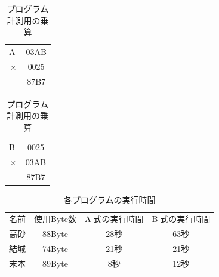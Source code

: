 \documentclass[dvipdfmx]{jsarticle}
\begin{document}
\begin{table}[H]
    \centering
    \caption{プログラム計測用の乗算}
    \label{table:fast}
    \begin{minipage}[b]{0.49\columnwidth}
        \centering
        \begin{tabular}{cc}
            \textcircled{\scriptsize A}& 03AB \\
            $\times$ & 0025 \\
            \hline
            & 87B7
        \end{tabular}
    \end{minipage}
    \begin{minipage}[b]{0.49\columnwidth}
        \centering
        \begin{tabular}{cc}
            \textcircled{\scriptsize B}& 0025 \\
            $\times$ & 03AB \\
            \hline
            & 87B7
        \end{tabular}
    \end{minipage}
\end{table}

\begin{table}[H]
    \centering
    \caption{各プログラムの実行時間}
    \label{table:time}
    \begin{tabular}{|c|c|c|c|}
        名前 & 使用Byte数 & \textcircled{\scriptsize A}式の実行時間 & \textcircled{\scriptsize B}式の実行時間 \\
        高砂 & 88Byte & 28秒 & 63秒 \\
        結城 & 74Byte & 21秒 & 21秒 \\
        末本 & 89Byte & 8秒 & 12秒
    \end{tabular}
\end{table}

    
\end{document}
